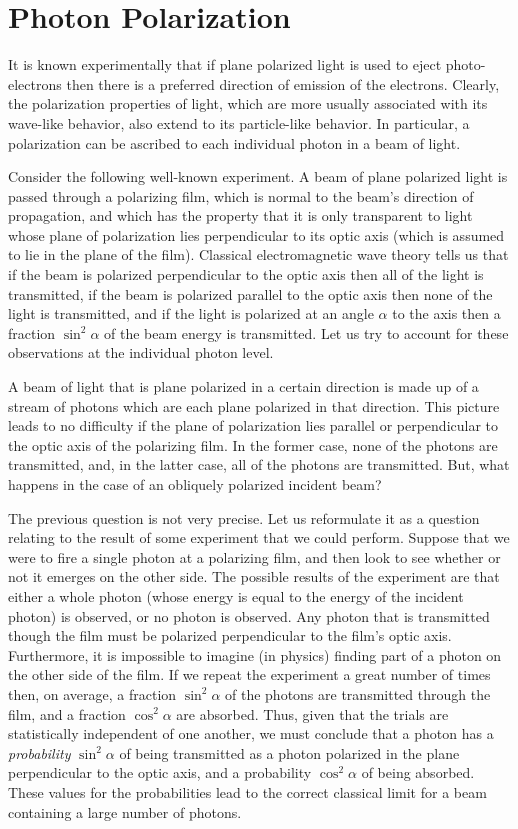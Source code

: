 \section{Photon Polarization}
It is known experimentally that if plane polarized light is used to
eject photo-electrons then there is a preferred direction of emission of
the electrons. Clearly, the polarization properties of light, which are more usually
associated with its wave-like behavior, also extend to its  particle-like
behavior. In particular, a polarization can be ascribed to each 
individual photon in a
beam of light. 

Consider the following well-known experiment. A beam of plane polarized
light is passed through a polarizing film, which is normal to the beam's direction of propagation, and which
has the property that it is only transparent to
light whose plane of polarization lies perpendicular to its optic axis (which is assumed to lie in the plane
of the film).
  Classical electromagnetic wave theory tells us that
if the beam is polarized perpendicular to the optic axis then all of the light
is transmitted, if the beam is polarized parallel to the optic axis
then none of the light is transmitted, and if the light is
polarized at an angle $\alpha$ to the  axis then  a fraction $\sin^2\alpha$
of the beam energy is transmitted. Let us try to account for these observations
at the individual photon level.  

A beam of light that is plane polarized in a certain direction is
made up of a stream of photons which are each plane polarized in that direction.
This picture leads to no difficulty if the plane of polarization lies parallel
or perpendicular to the optic axis of the polarizing film. In the former case, none of the
photons are transmitted, and, in the latter case, all of the photons are transmitted.
But, what happens in the case of an obliquely polarized incident beam?

The previous question is not very precise. Let us reformulate it as a question
relating to the result of some experiment that we could perform. 
Suppose that we were to fire a single photon at a polarizing  film, and then look
to see whether or not it emerges on the other side. The possible
results of the experiment are that either a whole photon (whose energy
is equal to the energy of the incident photon) is observed, or no photon
is observed. Any photon that is transmitted though the film must 
be polarized perpendicular to the film's optic axis. Furthermore, it is impossible to
imagine (in physics) finding part of a photon on the other side of the film.
If we repeat the experiment a great number of times then, on average,
a fraction $\sin^2\alpha$ of the photons are transmitted through the film, and
a fraction $\cos^2\alpha$ are absorbed. Thus, given that the trials are statistically independent of one another, we must conclude that a photon has a {\em probability}\/ 
$\sin^2\alpha$ of being transmitted as a photon polarized in the plane
perpendicular to the optic axis, and a probability $\cos^2\alpha$ of
being absorbed. These values for the probabilities lead to the correct classical
limit for a beam containing a large number of photons. 

